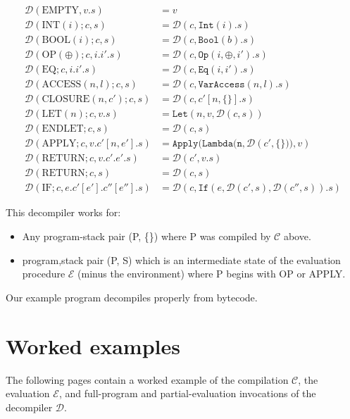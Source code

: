 \documentclass[11pt]{article}
\begin{document}
\begin{align*}
\mathcal{D}(\text{EMPTY}, v.s) &= v\\
\mathcal{D}(\text{INT}(i); c, s) &= \mathcal{D}(c, \texttt{Int}(i).s)\\
\mathcal{D}(\text{BOOL}(i); c, s) &= \mathcal{D}(c, \texttt{Bool}(b).s)\\
\mathcal{D}(\text{OP}(\oplus); c, i.i'.s) &= \mathcal{D}(c, \texttt{Op}(i, \oplus, i').s) \\
\mathcal{D}(\text{EQ}; c, i.i'.s) &= \mathcal{D}(c, \texttt{Eq}(i, i').s)\\
\mathcal{D}(\text{ACCESS}(n, l); c, s) &= \mathcal{D}(c, \texttt{VarAccess}(n, l).s)\\
\mathcal{D}(\text{CLOSURE}(n, c'); c, s) &= \mathcal{D}(c, c'[n, \{\}].s)\\
\mathcal{D}(\text{LET}(n); c, v.s) &= \texttt{Let}(n, v, \mathcal{D}(c, s))\\
\mathcal{D}(\text{ENDLET}; c, s) &= \mathcal{D}(c, s)\\
\mathcal{D}(\text{APPLY}; c, v.c'[n, e'].s) &= \texttt{Apply}(\texttt{Lambda(n}, \mathcal{D}(c', \{\}\texttt{))}, v)\\
\mathcal{D}(\text{RETURN}; c, v.c'.e'.s) &= \mathcal{D}(c', v.s)\\
\mathcal{D}(\text{RETURN}; c, s) &= \mathcal{D}(c, s)\\
\mathcal{D}(\text{IF}; c, e.c'[e'].c''[e''].s) &= \mathcal{D}(c, \texttt{If}(e, \mathcal{D}(c', s), \mathcal{D}(c'', s)).s)
\end{align*}

\noindent This decompiler works for:

\begin{itemize}
\item Any program-stack pair (P, \{\}) where P was compiled by $\mathcal{C}$ above.
\item program,stack pair (P, S) which is an intermediate state of the evaluation procedure $\mathcal{E}$ (minus the environment) where P begins with OP or APPLY.
\end{itemize}

\noindent Our example program decompiles properly from bytecode.

\section{Worked examples}

The following pages contain a worked example of the compilation $\mathcal{C}$, the evaluation $\mathcal{E}$, and full-program and partial-evaluation invocations of the decompiler $\mathcal{D}$.
\end{document}
